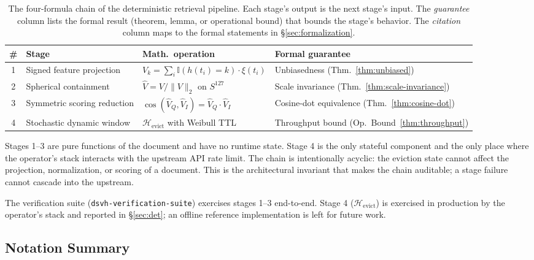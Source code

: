 \documentclass[10pt,twocolumn]{article}
\theoremstyle{definition}
\theoremstyle{remark}
\begin{document}
\begin{table}[h]
\centering
\caption{The four-formula chain of the deterministic retrieval
pipeline. Each stage's output is the next stage's input. The
\emph{guarantee} column lists the formal result (theorem, lemma, or
operational bound) that bounds the stage's behavior. The
\emph{citation} column maps to the formal statements in
\S\ref{sec:formalization}.}
\label{tab:four-formulas}
\begin{tabular}{clll}
\hline
\textbf{\#} & \textbf{Stage} & \textbf{Math.\ operation} & \textbf{Formal guarantee} \\
\hline
1 & Signed feature projection &
   $V_k = \sum_i \mathbb{I}(h(t_i) = k) \cdot \xi(t_i)$ &
   Unbiasedness (Thm.~\ref{thm:unbiased}) \\
2 & Spherical containment &
   $\hat{V} = V / \|V\|_2$ on $S^{127}$ &
   Scale invariance (Thm.~\ref{thm:scale-invariance}) \\
3 & Symmetric scoring reduction &
   $\cos(\hat{V}_Q, \hat{V}_I) = \hat{V}_Q \cdot \hat{V}_I$ &
   Cosine-dot equivalence (Thm.~\ref{thm:cosine-dot}) \\
4 & Stochastic dynamic window &
   $\mathcal{H}_{\text{evict}}$ with Weibull TTL &
   Throughput bound (Op.\ Bound~\ref{thm:throughput}) \\
\hline
\end{tabular}
\end{table}

Stages 1--3 are pure functions of the document and have no runtime
state. Stage 4 is the only stateful component and the only place where
the operator's stack interacts with the upstream API rate limit. The
chain is intentionally acyclic: the eviction state cannot affect the
projection, normalization, or scoring of a document. This is the
architectural invariant that makes the chain auditable; a stage
failure cannot cascade into the upstream.

The verification suite (\texttt{dsvh-verification-suite}) exercises
stages 1--3 end-to-end. Stage 4 (\(\mathcal{H}_{\text{evict}}\)) is
exercised in production by the operator's stack and reported in
\S\ref{sec:det}; an offline reference implementation is left for
future work.

\subsection{Notation Summary}
\end{document}
